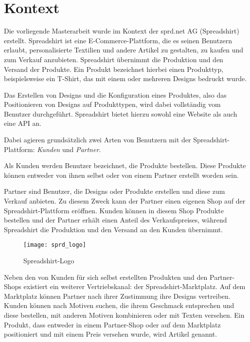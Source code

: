 \section{Kontext}   
\label{spreadshirt}

Die vorliegende Masterarbeit wurde im Kontext der sprd.net AG (Spreadshirt) \cite{sprd2013} erstellt. Spreadshirt ist eine E-Commerce-Plattform, die es seinen Benutzern erlaubt, personalisierte Textilien und andere Artikel zu gestalten, zu kaufen und zum Verkauf anzubieten. Spreadshirt übernimmt die Produktion und den Versand der Produkte. Ein Produkt bezeichnet hierbei einen Produkttyp, beispielsweise ein T-Shirt, das mit einem oder mehreren Designs bedruckt wurde.

Das Erstellen von Designs und die Konfiguration eines Produktes, also das Positionieren von Designs auf Produkttypen, wird dabei vollständig vom Benutzer durchgeführt. Spreadshirt bietet hierzu sowohl eine Website als auch eine API an.

Dabei agieren grundsätzlich zwei Arten von Benutzern mit der Spreadshirt-Plattform: \emph{Kunden} und \emph{Partner}.

Als Kunden werden Benutzer bezeichnet, die Produkte bestellen. Diese Produkte können entweder von ihnen selbst oder von einem Partner erstellt worden sein. 

Partner sind Benutzer, die Designs oder Produkte erstellen und diese zum Verkauf anbieten. Zu diesem Zweck kann der Partner einen eigenen Shop auf der Spreadshirt-Plattform eröffnen. Kunden können in diesem Shop Produkte bestellen und der Partner erhält einen Anteil des Verkaufspreises, während Spreadshirt die Produktion und den Versand an den Kunden übernimmt.

\begin{figure}
\label{fig:logo}
\begin{center}
    \texttt{[image: sprd\_logo]}
\end{center}
\caption{Spreadshirt-Logo}
\end{figure}

Neben den von Kunden für sich selbst erstellten Produkten und den Partner-Shops existiert ein weiterer Vertriebskanal: der Spreadshirt-Marktplatz. Auf dem Marktplatz können Partner nach ihrer Zustimmung ihre Designs vertreiben. Kunden können nach Motiven suchen, die ihrem Geschmack entsprechen und diese bestellen, mit anderen Motiven kombinieren oder mit Texten versehen. Ein Produkt, dass entweder in einem Partner-Shop oder auf dem Marktplatz positioniert und mit einem Preis versehen wurde, wird Artikel genannt.

